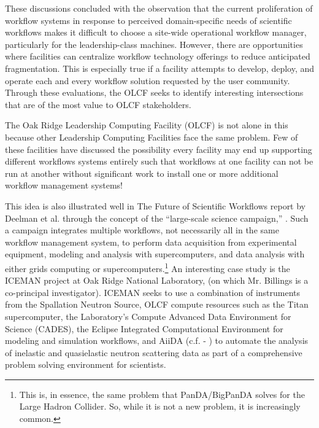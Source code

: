 \begin{displayquote}
These discussions concluded with the observation that the current proliferation
of workflow systems in response to perceived domain-specific needs of 
scientific workflows makes it difficult to choose a site-wide operational
workflow manager, particularly for the leadership-class machines. However,
there are opportunities where facilities can centralize workflow technology 
offerings to reduce anticipated fragmentation. This is especially true if a 
facility attempts to develop, deploy, and operate each and every workflow 
solution requested by the user community. Through these evaluations, the OLCF
seeks to identify interesting intersections that are of the most value to OLCF
stakeholders.
\end{displayquote}

The Oak Ridge Leadership Computing Facility (OLCF) is not alone in this
because other Leadership Computing Facilities face the same problem. Few
of these facilities have discussed the possibility every facility may end up
supporting different workflows systems entirely such that workflows at
one facility can not be run at another without significant work to
install one or more additional workflow management systems!

This idea is also illustrated well in The Future of Scientific Workflows report by Deelman et  
al. through the concept of the ``large-scale science campaign,'' \cite{deelman_future_2015}.
Such a campaign integrates multiple workflows, not necessarily all in the same workflow
management system, to perform data acquisition from experimental equipment, modeling and analysis with supercomputers, and data analysis with either grids computing or
supercomputers.\footnote{This is, in essence, the same problem that
PanDA/BigPanDA solves for the Large Hadron Collider. So, while it is not
a new problem, it is increasingly common.} An interesting case study is the ICEMAN project at Oak Ridge National Laboratory, (on which Mr. Billings is a co-principal investigator). ICEMAN
seeks to use a combination of instruments from the Spallation Neutron
Source, OLCF compute resources such as the Titan supercomputer, the
Laboratory's Compute Advanced Data Environment for Science (CADES), the
Eclipse Integrated Computational Environment for modeling and simulation workflows, and AiiDA (c.f. - \cite{pizzi_aiida:_2016}) to automate the analysis of inelastic and quasielastic neutron scattering data as part of a comprehensive problem solving environment for scientists.

